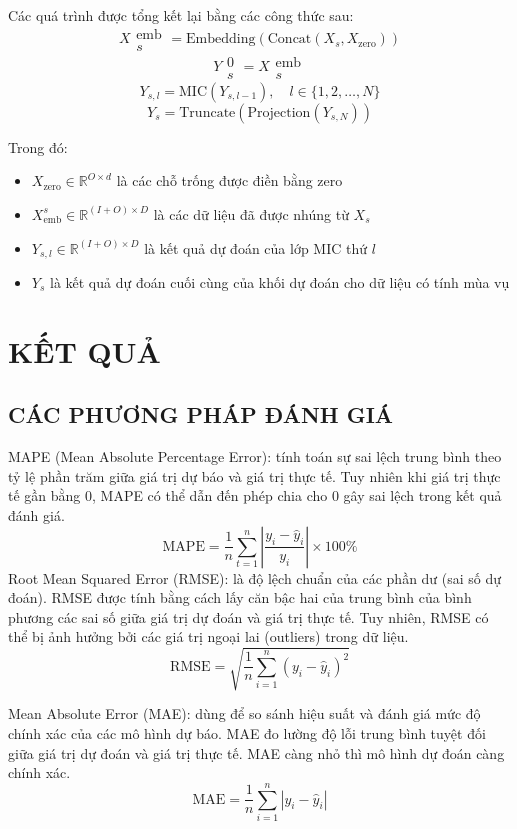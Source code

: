 \documentclass[conference]{IEEEtran}
\begin{document}
Các quá trình được tổng kết lại bằng các công thức sau:
\[X{\substack{\text{emb}\\s}}{} = {\text{Embedding}}(\text{Concat}(X_s, X_{\text{zero}}))\]
\[Y{\substack{\text{0}\\s}}{} = X{\substack{\text{emb}\\s}}{}\]
\[Y_{s,l} = \text{MIC}(Y_{s,l-1}), \quad l \in \{1, 2, \ldots, N\}\]
\[Y_s = \text{Truncate}(\text{Projection}(Y_{s,N}))\]

Trong đó:
\begin{itemize}
    \item \(X_{\text{zero}} \in \mathbb{R}^{O \times d}\) là các chỗ trống được điền bằng zero
    \item \(X_{\text{emb}}^s \in \mathbb{R}^{(I+O) \times D}\) là các dữ liệu đã được nhúng từ \(X_s\)
    \item \(Y_{s,l} \in \mathbb{R}^{(I+O) \times D}\) là kết quả dự đoán của lớp MIC thứ \(l\)
    \item \(Y_s\) là kết quả dự đoán cuối cùng của khối dự đoán cho dữ liệu có tính mùa vụ
\end{itemize}


\section{KẾT QUẢ}
\subsection{CÁC PHƯƠNG PHÁP ĐÁNH GIÁ}
MAPE (Mean Absolute Percentage Error): tính toán sự sai lệch trung bình theo tỷ lệ phần trăm giữa giá trị dự báo và giá trị thực tế. Tuy nhiên khi giá trị thực tế gần bằng 0, MAPE có thể dẫn đến phép chia cho 0 gây sai lệch trong kết quả đánh giá.
\[\text{MAPE} = \frac{1}{n} \sum_{t=1}^{n} \left| \frac{y_i - \hat{y}_i}{y_i} \right| \times 100\%\]
Root Mean Squared Error (RMSE): là độ lệch chuẩn của các phần dư (sai số dự đoán). RMSE được tính bằng cách lấy căn bậc hai của trung bình của bình phương các sai số giữa giá trị dự đoán và giá trị thực tế. Tuy nhiên, RMSE có thể bị ảnh hưởng bởi các giá trị ngoại lai (outliers) trong dữ liệu. 
\[\text{RMSE} = \sqrt{\frac{1}{n} \sum_{i=1}^{n} (y_i - \hat{y}_i)^2}\]

Mean Absolute Error (MAE): dùng để so sánh hiệu suất và đánh giá mức độ chính xác của các mô hình dự báo. MAE đo lường độ lỗi trung bình tuyệt đối giữa giá trị dự đoán và giá trị thực tế. MAE càng nhỏ thì mô hình dự đoán càng chính xác.
\[\text{MAE} = \frac{1}{n} \sum_{i=1}^{n} |y_i - \hat{y}_i|\]
\end{document}

